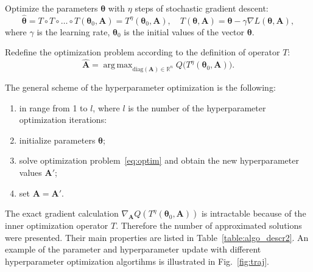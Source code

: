 \documentclass[smallcondensed]{svjour3}
\DeclareMathOperator*{\argmax}{arg\,max}
\begin{document}
Optimize the parameters  $\boldsymbol{\theta}$ with $\eta$ steps of stochastic gradient descent:
\begin{equation}
\label{eq:gd}
	 \hat{\boldsymbol{\theta}} = T \circ T \circ \dots \circ T(\boldsymbol{\theta}_0, \mathbf{A}) = T^\eta(\boldsymbol{\theta}_0, \mathbf{A}), \quad 	T(\boldsymbol{\theta}, \mathbf{A}) =\boldsymbol{\theta} - \gamma \nabla L(\boldsymbol{\theta}, \mathbf{A}), 
\end{equation}
where $\gamma$ is the learning rate, $\boldsymbol{\theta}_0$ is the initial values of the vector $\boldsymbol{\theta}$. 

Redefine the optimization problem according to the definition of operator $T$:
\begin{equation}
\label{eq:optim}
	\hat{\mathbf{A}} = \argmax_{\text{diag}(\mathbf{A}) \in \mathbb{R}^n} Q\bigl( T^\eta(\boldsymbol{\theta}_0, \mathbf{A})\bigr).
\end{equation}

The general scheme of the hyperparameter optimization is the following:
\begin{enumerate}
\item in range from 1 to  $l$, where $l$ is the number of the hyperparameter optimization iterations:
\item initialize parameters $\boldsymbol{\theta}$;
\item solve optimization problem~\eqref{eq:optim} and obtain the new hyperparameter values $\mathbf{A}'$;
\item set $\mathbf{A} = \mathbf{A}'$.
\end{enumerate}

The exact gradient calculation $\nabla_{\mathbf{A}} Q( T^\eta(\boldsymbol{\theta}_0, \mathbf{A}))$ is intractable because of the inner optimization operator $T$. Therefore the number of approximated solutions were presented. Their main properties are listed in Table~\ref{table:algo_descr2}. An example of the parameter and hyperparameter update with different hyperparameter optimization algortihms is illustrated in Fig.~\ref{fig:traj}.
\end{document}
